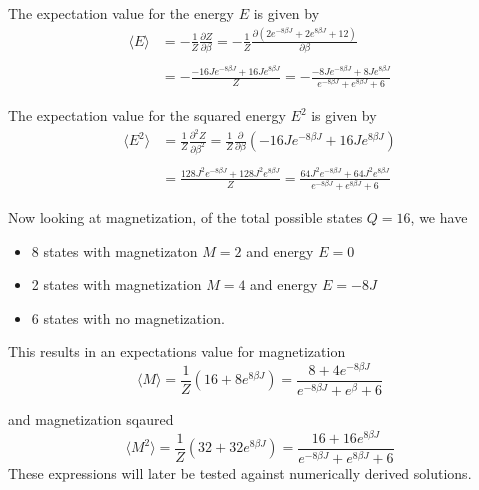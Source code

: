 \documentclass[10pt,a4paper]{article}
\begin{document}
The expectation value for the energy $E$ is given by
\begin{equation}\begin{split}
\langle E \rangle &= -\frac{1}{Z}\frac{\partial Z}{\partial\beta} = -\frac{1}{Z} \frac{\partial (2e^{-8\beta J} + 2e^{8\beta J} + 12)}{\partial \beta}\\\\
&= -\frac{-16Je^{-8\beta J} + 16Je^{8\beta J}}{Z} = -\frac{-8Je^{-8\beta J} + 8Je^{8\beta J}}{e^{-8\beta J} + e^{8\beta J} + 6}
\end{split}\end{equation}

The expectation value for the squared energy $E^2$ is given by
\begin{equation}\begin{split}
\langle E^2 \rangle &= \frac{1}{Z}\frac{\partial^2 Z}{\partial\beta^2} = \frac{1}{Z}\frac{\partial}{\partial\beta}\left(-16Je^{-8\beta J} + 16Je^{8\beta J} \right)\\\\
&= \frac{128J^2e^{-8\beta J} + 128J^2e^{8\beta J}}{Z} = \frac{64J^2e^{-8\beta J} + 64J^2e^{8\beta J}}{e^{-8\beta J}+e^{8\beta J} + 6}
\end{split}\end{equation}



Now looking at magnetization, of the total possible states $Q = 16$, we have
\begin{itemize}
\item 8 states with magnetizaton $M = 2$ and energy $E = 0$
\item 2 states with magnetization $M = 4$ and energy $E = -8J$
\item 6 states with no magnetization.
\end{itemize}
This results in an expectations value for magnetization
\begin{equation}
\langle M \rangle = \frac{1}{Z} (16+8e^{8\beta J}) = \frac{8+4e^{-8\beta J}}{e^{-8\beta J} + e^{\beta} + 6}
\end{equation}

and magnetization sqaured
\begin{equation}
\langle M^2 \rangle = \frac{1}{Z} (32+32e^{8\beta J}) = \frac{16 + 16e^{8\beta J}}{e^{-8\beta J} + e^{8\beta J} + 6}
\end{equation}
These expressions will later be tested against numerically derived solutions.
\end{document}
